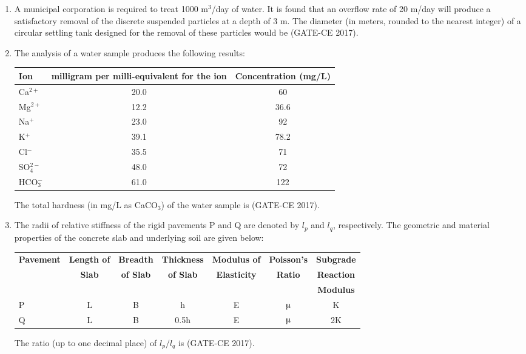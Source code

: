 \documentclass[journal,12pt,onecolumn]{article}
\theoremstyle{remark}
\begin{document}
\begin{enumerate}
    \item A municipal corporation is required to treat 1000 m$^3$/day of water. It is found that an overflow rate of 20 m/day will produce a satisfactory removal of the discrete suspended particles at a depth of 3 m. The diameter (in meters, rounded to the nearest integer) of a circular settling tank designed for the removal of these particles would be \underline{\hspace{3cm}} \hfill (GATE-CE 2017).

    \item The analysis of a water sample produces the following results:
    \begin{table}[H]
    \centering
    \begin{tabular}{|l|c|c|}
    \hline
    \textbf{Ion} & \textbf{milligram per milli-equivalent for the ion} & \textbf{Concentration (mg/L)} \\
    \hline
    Ca$^{2+}$ & 20.0 & 60 \\
    Mg$^{2+}$ & 12.2 & 36.6 \\
    Na$^{+}$ & 23.0 & 92 \\
    K$^{+}$ & 39.1 & 78.2 \\
    Cl$^{-}$ & 35.5 & 71 \\
    SO$_{4}^{2-}$ & 48.0 & 72 \\
    HCO$_{3}^{-}$ & 61.0 & 122 \\
    \hline
    \end{tabular}
    \end{table}
    The total hardness (in mg/L as CaCO$_{3}$) of the water sample is \underline{\hspace{3cm}} \hfill (GATE-CE 2017).

    \item The radii of relative stiffness of the rigid pavements P and Q are denoted by $l_p$ and $l_q$, respectively. The geometric and material properties of the concrete slab and underlying soil are given below:
    \begin{table}[H]
    \centering
    \begin{tabular}{|l|c|c|c|c|c|c|}
    \hline
    \textbf{Pavement} & \textbf{Length of} & \textbf{Breadth} & \textbf{Thickness} & \textbf{Modulus of} & \textbf{Poisson's} & \textbf{Subgrade} \\
    & \textbf{Slab} & \textbf{of Slab} & \textbf{of Slab} & \textbf{Elasticity} & \textbf{Ratio} & \textbf{Reaction} \\
    & & & & & & \textbf{Modulus} \\
    \hline
    P & L & B & h & E & $\micro$ & K \\
    Q & L & B & 0.5h & E & $\micro$ & 2K \\
    \hline
    \end{tabular}
    \end{table}
    The ratio (up to one decimal place) of $ l_p / l_q $ is \underline{\hspace{3cm}} \hfill (GATE-CE 2017).


\end{enumerate}
\end{document}
